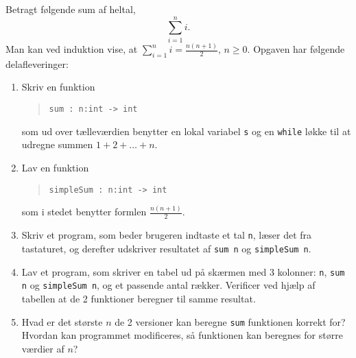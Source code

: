 Betragt følgende sum af heltal,
  \begin{equation}
    \sum_{i=1}^n i.
  \end{equation}
  Man kan ved induktion vise, at $\sum_{i=1}^n i = \frac{n(n+1)}{2},\, n\geq 0$. Opgaven har følgende delafleveringer:
  \begin{enumerate}
  \item \label{sum} Skriv en funktion
    \begin{quote}
      \mbox{\lstinline!sum : n:int -> int!}
    \end{quote}
    som ud over tælleværdien benytter en lokal variabel \lstinline!s! og en \lstinline!while! løkke til at udregne summen $1 + 2 + \dots + n$.
  \item Lav en funktion
    \begin{quote}
      \mbox{\lstinline!simpleSum : n:int -> int!}
    \end{quote}
    som i stedet benytter formlen $\frac{n(n+1)}{2}$.
  \item Skriv et program, som beder brugeren indtaste et tal \lstinline!n!, læser det fra tastaturet, og derefter udskriver resultatet af \lstinline!sum n! og \lstinline!simpleSum n!.
  \item Lav et program, som skriver en tabel ud på skærmen med 3 kolonner: \lstinline!n!, \lstinline!sum n! og \mbox{\lstinline!simpleSum n!}, og et passende antal rækker. Verificer ved hjælp af tabellen at de 2 funktioner beregner til samme resultat.
  \item Hvad er det største $n$ de 2 versioner kan beregne \lstinline{sum} funktionen korrekt for? Hvordan kan programmet modificeres, så funktionen kan beregnes for større værdier af $n$?
  \end{enumerate}
